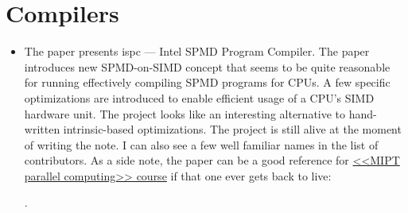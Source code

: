 \section*{Compilers}
\begin{itemize}
    \item The paper presents ispc --- Intel SPMD Program Compiler. The paper introduces new SPMD-on-SIMD concept that seems to be quite reasonable for running effectively compiling SPMD programs for CPUs. A few specific optimizations are introduced to enable efficient usage of a CPU's SIMD hardware unit. The project looks like an interesting alternative to hand-written intrinsic-based optimizations. The project is still alive at the moment of writing the note. I can also see a few well familiar names in the list of contributors. As a side note, the paper can be a good reference for \href{https://github.com/yulyugin/mipt-parallel-computing}{<<MIPT parallel computing>> course} if that one ever gets back to live:

    \cite{Pharr:ispc:2012}.
\end{itemize}


